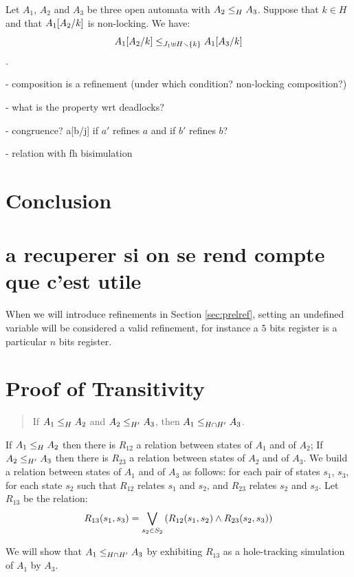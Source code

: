 \documentclass[runningheads]{llncs}
\begin{document}
\begin{theorem}[Congruence]
Let $A_1$, $A_2$ and $A_3$ be three open automata with $\wrel{A_2}{A_3}{H}$. 
Suppose that \(k \in H\) and that \(A_1\subst{A_2}{k}\) is non-locking.
We have: \[\wrel{A_1\subst{A_2}{k}}{A_1\subst{A_3}{k}}{J_1 \uplus H \setminus \mbrc{k}}\].
\end{theorem}
- composition is a refinement (under which condition? non-locking composition?)

- what is the property wrt deadlocks?

- congruence? a[b/j] if $a'$ refines $a$ and if $b'$ refines $b$?

- relation with fh bisimulation



\section{Conclusion}\label{sec:ccl}


\section{a recuperer si on se rend compte que c'est utile}
When we will introduce refinements in Section \ref{sec:prelref}, setting an undefined variable will be considered a valid refinement, for instance a \(5\) bits register is a particular \(n\) bits register.


\appendix
\section{Proof of Transitivity}\label{sec:proof-transitivity}
\begin{quote}
If $\wrel{A_1}{A_2}{H}$ and $\wrel{A_2}{A_3}{H'}$, then $\wrel{A_1}{A_3}{H\cap H'}$.
\end{quote}
\proof 
If $\wrel{A_1}{A_2}{H}$ then there is $R_{12}$ a relation between states
of $A_1$ and of $A_2$;  If $\wrel{A_2}{A_3}{H'}$ then there is $R_{23}$ a relation between states of $A_2$ and of $A_3$. We build a relation between
 states of $A_1$ and of $A_3$ as follows:  for each pair of states $s_1$, $s_3$, for each state $s_2$ such that $R_{12}$ relates $s_1$ and $s_2$, and $R_{23}$ relates $s_2$ and $s_3$.
Let $R_{13}$ be the relation:\\
  \[R_{13}(s_1,s_3)=\bigvee_{s_2\in S_2}\mpar{R_{12}(s_1,s_2) \land R_{23}(s_2,s_3) } \]

We will show that $\wrel{A_1}{A_3}{H\cap H'}$ by exhibiting  $R_{13}$ as a hole-tracking simulation of $A_1$ by  $A_3$.
\end{document}

